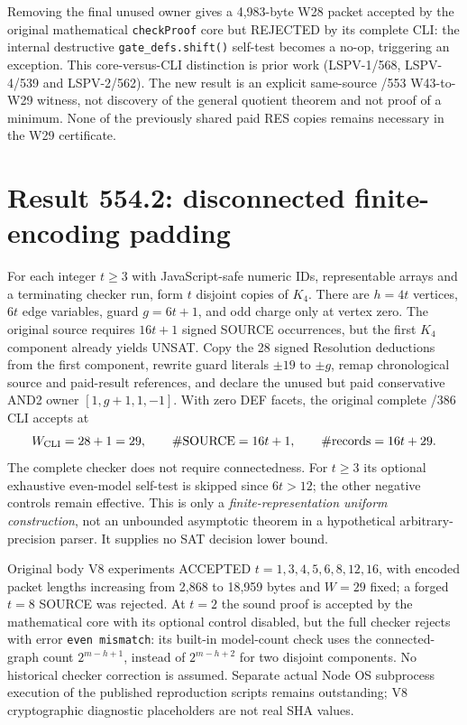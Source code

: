 \documentclass[11pt]{article}
\begin{document}
Removing the final unused owner gives a 4,983-byte W28 packet accepted by the original mathematical \texttt{checkProof} core but REJECTED by its complete CLI: the internal destructive \texttt{gate\_defs.shift()} self-test becomes a no-op, triggering an exception. This core-versus-CLI distinction is prior work (LSPV-1/568, LSPV-4/539 and LSPV-2/562). The new result is an explicit same-source /553 W43-to-W29 witness, not discovery of the general quotient theorem and not proof of a minimum. None of the previously shared paid RES copies remains necessary in the W29 certificate.

\section*{Result 554.2: disconnected finite-encoding padding}
For each integer $t\ge3$ with JavaScript-safe numeric IDs, representable arrays and a terminating checker run, form $t$ disjoint copies of $K_4$. There are $h=4t$ vertices, $6t$ edge variables, guard $g=6t+1$, and odd charge only at vertex zero. The original source requires $16t+1$ signed SOURCE occurrences, but the first $K_4$ component already yields UNSAT. Copy the 28 signed Resolution deductions from the first component, rewrite guard literals $\pm19$ to $\pm g$, remap chronological source and paid-result references, and declare the unused but paid conservative AND2 owner $[1,g+1,1,-1]$. With zero DEF facets, the original complete /386 CLI accepts at
\[
 W_{\rm CLI}=28+1=29,\qquad \#\mathrm{SOURCE}=16t+1,\qquad \#\mathrm{records}=16t+29.
\]
The complete checker does not require connectedness. For $t\ge3$ its optional exhaustive even-model self-test is skipped since $6t>12$; the other negative controls remain effective. This is only a \emph{finite-representation uniform construction}, not an unbounded asymptotic theorem in a hypothetical arbitrary-precision parser. It supplies no SAT decision lower bound.

Original body V8 experiments ACCEPTED $t=1,3,4,5,6,8,12,16$, with encoded packet lengths increasing from 2,868 to 18,959 bytes and $W=29$ fixed; a forged $t=8$ SOURCE was rejected. At $t=2$ the sound proof is accepted by the mathematical core with its optional control disabled, but the full checker rejects with error \texttt{even mismatch}: its built-in model-count check uses the connected-graph count $2^{m-h+1}$, instead of $2^{m-h+2}$ for two disjoint components. No historical checker correction is assumed. Separate actual Node OS subprocess execution of the published reproduction scripts remains outstanding; V8 cryptographic diagnostic placeholders are not real SHA values.
\end{document}
